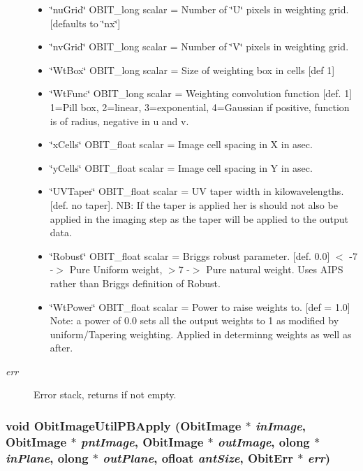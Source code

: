 \begin{Desc}
\begin{description}
\begin{itemize}
\item \char`\"{}nu\-Grid\char`\"{} OBIT\_\-long scalar = Number of \char`\"{}U\char`\"{} pixels in weighting grid. [defaults to \char`\"{}nx\char`\"{}] \item \char`\"{}nv\-Grid\char`\"{} OBIT\_\-long scalar = Number of \char`\"{}V\char`\"{} pixels in weighting grid. \item \char`\"{}Wt\-Box\char`\"{} OBIT\_\-long scalar = Size of weighting box in cells [def 1] \item \char`\"{}Wt\-Func\char`\"{} OBIT\_\-long scalar = Weighting convolution function [def. 1] 1=Pill box, 2=linear, 3=exponential, 4=Gaussian if positive, function is of radius, negative in u and v. \item \char`\"{}x\-Cells\char`\"{} OBIT\_\-float scalar = Image cell spacing in X in asec. \item \char`\"{}y\-Cells\char`\"{} OBIT\_\-float scalar = Image cell spacing in Y in asec. \item \char`\"{}UVTaper\char`\"{} OBIT\_\-float scalar = UV taper width in kilowavelengths. [def. no taper]. NB: If the taper is applied her is should not also be applied in the imaging step as the taper will be applied to the output data. \item \char`\"{}Robust\char`\"{} OBIT\_\-float scalar = Briggs robust parameter. [def. 0.0] $<$ -7 -$>$ Pure Uniform weight, $>$7 -$>$ Pure natural weight. Uses AIPS rather than Briggs definition of Robust. \item \char`\"{}Wt\-Power\char`\"{} OBIT\_\-float scalar = Power to raise weights to. [def = 1.0] Note: a power of 0.0 sets all the output weights to 1 as modified by uniform/Tapering weighting. Applied in determinng weights as well as after. \end{itemize}
\item[{\em err}]Error stack, returns if not empty. \end{description}
\end{Desc}
\subsubsection{\setlength{\rightskip}{0pt plus 5cm}void Obit\-Image\-Util\-PBApply ({\bf Obit\-Image} $\ast$ {\em in\-Image}, {\bf Obit\-Image} $\ast$ {\em pnt\-Image}, {\bf Obit\-Image} $\ast$ {\em out\-Image}, {\bf olong} $\ast$ {\em in\-Plane}, {\bf olong} $\ast$ {\em out\-Plane}, {\bf ofloat} {\em ant\-Size}, {\bf Obit\-Err} $\ast$ {\em err})}\label{ObitImageUtil_8c_a13}


